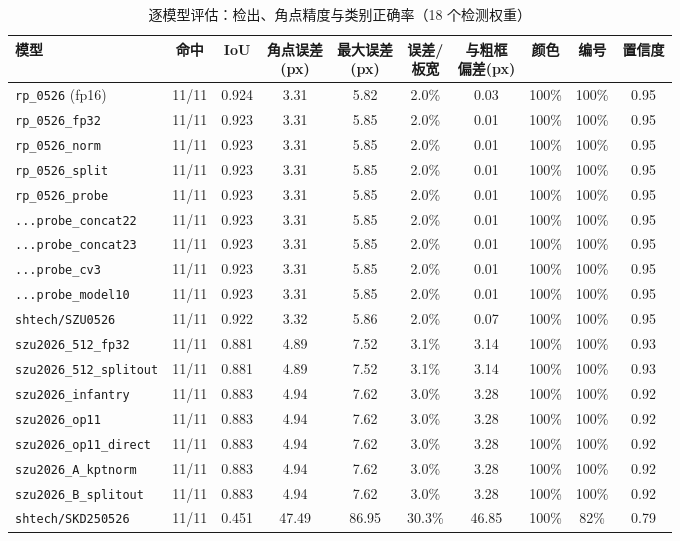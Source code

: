 \documentclass[11pt,a4paper]{ctexart}
\newcommand{\code}[1]{\texttt{\small #1}}
\newcommand{\bad}[1]{\textcolor{red!65!black}{#1}}
\begin{document}
\begin{table}[htbp]
\centering\small
\caption{逐模型评估：检出、角点精度与类别正确率（18 个检测权重）}\label{tab:eval}
{\footnotesize
\begin{tabular}{@{}lccccccccc@{}}
\toprule
模型 & 命中 & IoU & \makecell{角点误差\\(px)} & \makecell{最大误差\\(px)} & \makecell{误差/\\板宽} &
\makecell{与粗框\\偏差(px)} & 颜色 & 编号 & 置信度\\
\midrule
\code{rp\_0526} (fp16) & 11/11 & 0.924 & 3.31 & 5.82 & 2.0\% & 0.03 & 100\% & 100\% & 0.95\\
\code{rp\_0526\_fp32} & 11/11 & 0.923 & 3.31 & 5.85 & 2.0\% & 0.01 & 100\% & 100\% & 0.95\\
\code{rp\_0526\_norm} & 11/11 & 0.923 & 3.31 & 5.85 & 2.0\% & 0.01 & 100\% & 100\% & 0.95\\
\code{rp\_0526\_split} & 11/11 & 0.923 & 3.31 & 5.85 & 2.0\% & 0.01 & 100\% & 100\% & 0.95\\
\code{rp\_0526\_probe} & 11/11 & 0.923 & 3.31 & 5.85 & 2.0\% & 0.01 & 100\% & 100\% & 0.95\\
\code{...probe\_concat22} & 11/11 & 0.923 & 3.31 & 5.85 & 2.0\% & 0.01 & 100\% & 100\% & 0.95\\
\code{...probe\_concat23} & 11/11 & 0.923 & 3.31 & 5.85 & 2.0\% & 0.01 & 100\% & 100\% & 0.95\\
\code{...probe\_cv3} & 11/11 & 0.923 & 3.31 & 5.85 & 2.0\% & 0.01 & 100\% & 100\% & 0.95\\
\code{...probe\_model10} & 11/11 & 0.923 & 3.31 & 5.85 & 2.0\% & 0.01 & 100\% & 100\% & 0.95\\
\code{shtech/SZU0526} & 11/11 & 0.922 & 3.32 & 5.86 & 2.0\% & 0.07 & 100\% & 100\% & 0.95\\
\midrule
\code{szu2026\_512\_fp32} & 11/11 & 0.881 & 4.89 & 7.52 & 3.1\% & 3.14 & 100\% & 100\% & 0.93\\
\code{szu2026\_512\_splitout} & 11/11 & 0.881 & 4.89 & 7.52 & 3.1\% & 3.14 & 100\% & 100\% & 0.93\\
\code{szu2026\_infantry} & 11/11 & 0.883 & 4.94 & 7.62 & 3.0\% & 3.28 & 100\% & 100\% & 0.92\\
\code{szu2026\_op11} & 11/11 & 0.883 & 4.94 & 7.62 & 3.0\% & 3.28 & 100\% & 100\% & 0.92\\
\code{szu2026\_op11\_direct} & 11/11 & 0.883 & 4.94 & 7.62 & 3.0\% & 3.28 & 100\% & 100\% & 0.92\\
\code{szu2026\_A\_kptnorm} & 11/11 & 0.883 & 4.94 & 7.62 & 3.0\% & 3.28 & 100\% & 100\% & 0.92\\
\code{szu2026\_B\_splitout} & 11/11 & 0.883 & 4.94 & 7.62 & 3.0\% & 3.28 & 100\% & 100\% & 0.92\\
\midrule
\code{shtech/SKD250526} & 11/11 & \bad{0.451} & \bad{47.49} & \bad{86.95} & \bad{30.3\%} & \bad{46.85} & 100\% & \bad{82\%} & 0.79\\
\bottomrule
\end{tabular}}
\end{table}
\end{document}
